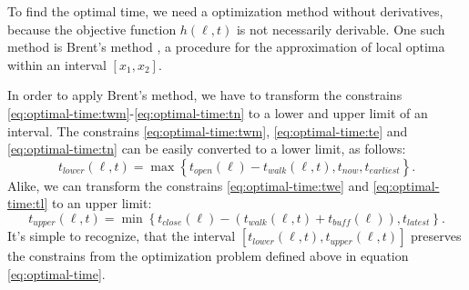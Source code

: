  To find the optimal time, we need a optimization method without derivatives, because the objective function $h(\ell, t)$ is not necessarily derivable. One such method is Brent's method \parencite{Brent2002}, a procedure for the approximation of local optima within an interval $[x_1, x_2]$.
 
 In order to apply Brent's method, we have to transform the constrains \eqref{eq:optimal-time:twm}-\eqref{eq:optimal-time:tn} to a lower and upper limit of an interval.  The constrains \eqref{eq:optimal-time:twm}, \eqref{eq:optimal-time:te} and \eqref{eq:optimal-time:tn} can  be easily converted to a lower limit, as follows: 
  	\begin{equation}\label{eq:lower-limit}
  		t_{lower}(\ell, t) = \max\left\lbrace  t_{open}(\ell)-t_{walk}(\ell, t), t_{now}, t_{earliest} \right\rbrace.
  	\end{equation}
  Alike, we can transform the constrains \eqref{eq:optimal-time:twe} and \eqref{eq:optimal-time:tl} to an upper limit:
  	\begin{equation}\label{eq:upper-limit}
  		t_{upper}(\ell, t) = \min\left\lbrace  t_{close}(\ell)- (t_{walk}(\ell, t) + t_{buff}(\ell)), t_{latest} \right\rbrace.
  	\end{equation}
 It's simple to recognize, that the interval $[t_{lower}(\ell, t), t_{upper}(\ell, t)]$ preserves the constrains from the optimization problem defined above in equation \eqref{eq:optimal-time}.  
 
